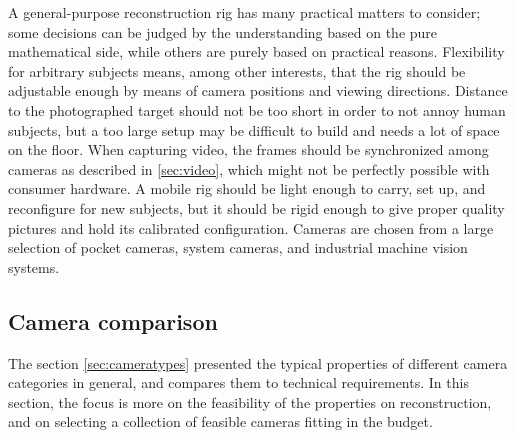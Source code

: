 
A general-purpose reconstruction rig has many practical matters to consider; some decisions can be judged by the understanding based on the pure mathematical side, while others are purely based on practical reasons.
Flexibility for arbitrary subjects means, among other interests, that the rig should be adjustable enough by means of camera positions and viewing directions.
Distance to the photographed target should not be too short in order to not annoy human subjects, but a too large setup may be difficult to build and needs a lot of space on the floor.
When capturing video, the frames should be synchronized among cameras as described in \ref{sec:video}, which might not be perfectly possible with consumer hardware.
A mobile rig should be light enough to carry, set up, and reconfigure for new subjects, but it should be rigid enough to give proper quality pictures and hold its calibrated configuration.
Cameras are chosen from a large selection of pocket cameras, system cameras, and industrial machine vision systems.



\subsection{Camera comparison} \label{sec:cameracomparison} %

The section \ref{sec:cameratypes} presented the typical properties of different camera categories in general, and compares them to technical requirements.
In this section, the focus is more on the feasibility of the properties on reconstruction, and on selecting a collection of feasible cameras fitting in the budget.

